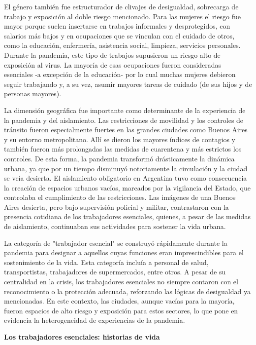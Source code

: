 El género también fue estructurador de clivajes de desigualdad, sobrecarga de trabajo y exposición al doble riesgo mencionado. Para las mujeres el riesgo fue mayor porque suelen insertarse en trabajos informales y desprotegidos, con salarios más bajos y en ocupaciones que se vinculan con el cuidado de otros, como la educación, enfermería, asistencia social, limpieza, servicios personales. Durante la pandemia, este tipo de trabajos supusieron un riesgo alto de exposición al virus. La mayoría de esas ocupaciones fueron consideradas esenciales -a excepción de la educación- por lo cual muchas mujeres debieron seguir trabajando y, a su vez, asumir mayores tareas de cuidado (de sus hijos y de personas mayores).

La dimensión geográfica fue importante como determinante de la experiencia de la pandemia y del aislamiento. Las restricciones de movilidad y los controles de tránsito fueron especialmente fuertes en las grandes ciudades como Buenos Aires y su entorno metropolitano. Allí se dieron los mayores índices de contagios y también fueron más prolongadas las medidas de cuarentena y más estrictos los controles. De esta forma, la pandemia transformó drásticamente la dinámica urbana, ya que por un tiempo disminuyó notoriamente la circulación y la ciudad se veía desierta. El aislamiento obligatorio en Argentina tuvo como consecuencia la creación de espacios urbanos vacíos, marcados por la vigilancia del Estado, que controlaba el cumplimiento de las restricciones. Las imágenes de una Buenos Aires desierta, pero bajo supervisión policial y militar, contrastaron con la presencia cotidiana de los trabajadores esenciales, quienes, a pesar de las medidas de aislamiento, continuaban sus actividades para sostener la vida urbana.

La categoría de "trabajador esencial" se construyó rápidamente durante la pandemia para designar a aquellos cuyas funciones eran imprescindibles para el sostenimiento de la vida. Esta categoría incluía a personal de salud, transportistas, trabajadores de supermercados, entre otros. A pesar de su centralidad en la crisis, los trabajadores esenciales no siempre contaron con el reconocimiento o la protección adecuada, reforzando las lógicas de desigualdad ya mencionadas. En este contexto, las ciudades, aunque vacías para la mayoría, fueron espacios de alto riesgo y exposición para estos sectores, lo que pone en evidencia la heterogeneidad de experiencias de la pandemia.

\textbf{Los trabajadores esenciales: historias de vida}

